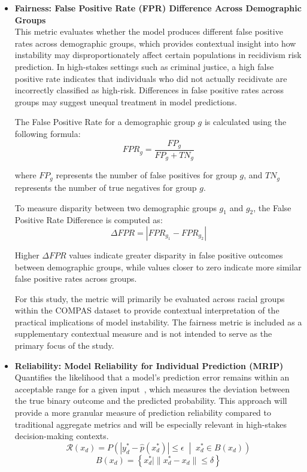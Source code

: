 \documentclass[12pt]{article}
\begin{document}
\begin{itemize}
  \item \textbf{Fairness: False Positive Rate (FPR) Difference Across Demographic Groups}\\
  \tab This metric evaluates whether the model produces different false positive rates across demographic groups, which provides contextual insight into how instability may disproportionately affect certain populations in recidivism risk prediction. In high-stakes settings such as criminal justice, a high false positive rate indicates that individuals who did not actually recidivate are incorrectly classified as high-risk. Differences in false positive rates across groups may suggest unequal treatment in model predictions.

  The False Positive Rate for a demographic group $g$ is calculated using the following formula:
  \[
  FPR_g = \frac{FP_g}{FP_g + TN_g}
  \]

  where $FP_g$ represents the number of false positives for group $g$, and $TN_g$ represents the number of true negatives for group $g$.

  To measure disparity between two demographic groups $g_1$ and $g_2$, the False Positive Rate Difference is computed as:
  \[
  \Delta FPR = |FPR_{g_1} - FPR_{g_2}|
  \]

  Higher $\Delta FPR$ values indicate greater disparity in false positive outcomes between demographic groups, while values closer to zero indicate more similar false positive rates across groups.

  For this study, the metric will primarily be evaluated across racial groups within the COMPAS dataset to provide contextual interpretation of the practical implications of model instability. The fairness metric is included as a supplementary contextual measure and is not intended to serve as the primary focus of the study.

  \item \textbf{Reliability: Model Reliability for Individual Prediction (MRIP)}\\ 
  \tab Quantifies the likelihood that a model's prediction error remains within an acceptable range for a given input~\cite{zhang2024reliability}, which measures the deviation between the true binary outcome and the predicted probability. This approach will provide a more granular measure of prediction reliability compared to traditional aggregate metrics and will be especially relevant in high-stakes decision-making contexts.
  \[
  \mathcal{R}(x_d) =
  P\left(
    \left| y_d^* - \hat{p}(x_d^*) \right| \le \epsilon
    \;\middle|\;
    x_d^* \in B(x_d)
  \right) \]
  \[ B(x_d) = \left\{ x_d^* \mid \| x_d^* - x_d \| \le \delta \right\} \]


\end{itemize}
\end{document}
